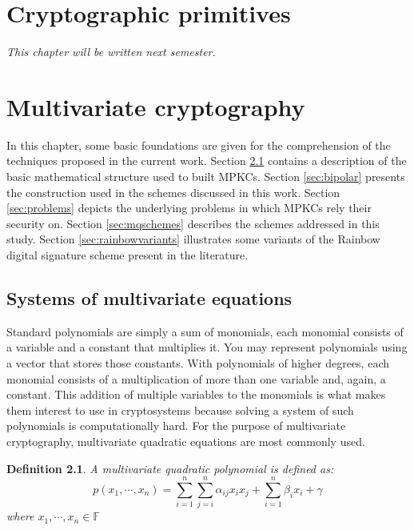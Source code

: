 \documentclass{ufsctex/ufsctex}
\newtheorem{definition}{Definition}
\begin{document}
\chapter{Cryptographic primitives}

\textit{This chapter will be written next semester.}

\chapter{Multivariate cryptography}

In this chapter, some basic foundations are given for the comprehension of the
techniques proposed in the current work. Section \ref{sec:mqsystems} contains a
description of the basic mathematical structure used to built MPKCs. Section
\ref{sec:bipolar} presents the construction used in the schemes discussed in
this work. Section \ref{sec:problems} depicts the underlying problems in which
MPKCs rely their security on. Section \ref{sec:mqschemes} describes the schemes
addressed in this study. Section \ref{sec:rainbowvariants} illustrates some
variants of the Rainbow digital signature scheme present in the literature.

\section{Systems of multivariate equations}\label{sec:mqsystems}

Standard polynomials are simply a sum of monomials, each monomial consists of a
variable and a constant that multiplies it. You may represent polynomials using
a vector that stores those constants. With polynomials of higher degrees, each
monomial consists of a multiplication of more than one variable and, again, a
constant. This addition of multiple variables to the monomials is what makes
them interest to use in cryptosystems because solving a system of such
polynomials is computationally hard. For the purpose of multivariate
cryptography, multivariate quadratic equations are most commonly used.

\begin{definition}
A multivariate quadratic polynomial is defined as:
\begin{equation}
p(x_1,\cdots,x_n) = \sum_{i=1}^n \sum_{j=i}^n \alpha_{ij} x_i x_j +
	\sum_{i=1}^n \beta_i x_i + \gamma
\end{equation}
where $x_1,\cdots,x_n \in \mathbb{F}$
\end{definition}
\end{document}
